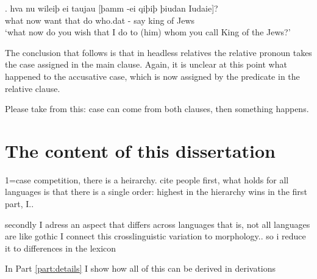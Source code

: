 \exg. hva nu wileiþ ei taujau [þamm -ei qiþiþ þiudan Iudaie]?\\
 what now want that do\scsub{[dat]} who.\ac{dat} - say\scsub{[acc]} king {of Jews}\\
 `what now do you wish that I do to (him) whom you call King of the Jews?' \label{ex:gothicdatacc}

The conclusion that follows is that in headless relatives the relative pronoun takes the case assigned in the main clause. Again, it is unclear at this point what happened to the accusative case, which is now assigned by the predicate in the relative clause.

Please take from this: case can come from both clauses, then something happens.



\section{The content of this dissertation}

1=case competition, there is a heirarchy. cite people
first, what holds for all languages is that there is a single order: highest in the hierarchy wins
in the first part, I..

secondly I adress an aspect that differs across languages
that is, not all languages are like gothic
I connect this crosslinguistic variation to morphology.. so i reduce it to differences in the lexicon

In Part \ref{part:details} I show how all of this can be derived in derivations
